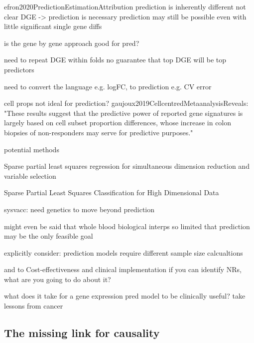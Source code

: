 \begin{outline}
    efron2020PredictionEstimationAttribution prediction is inherently different
            not clear DGE -> prediction is necessary
            prediction may still be possible even with little significant single gene diffs

            is the gene by gene approach good for pred?
        
        need to repeat DGE within folds
            no guarantee that top DGE will be top predictors

        need to convert the language e.g. logFC, to prediction e.g. CV error

        cell props not ideal for prediction?
            gaujoux2019CellcentredMetaanalysisReveals: "These results suggest that the predictive power of reported gene signatures is largely based on cell subset proportion differences, whose increase in colon biopsies of non-responders may serve for predictive purposes."


        potential methods

            Sparse partial least squares regression for simultaneous dimension reduction and variable selection

             Sparse Partial Least Squares Classification for High Dimensional Data 

        sysvacc: need genetics to move beyond prediction

    might even be said that whole blood biological interps so limited that prediction may be the only feasible goal

    explicitly consider:
    prediction models require different sample size calcualtions

    and to Cost-effectiveness and clinical implementation
        if you can identify NRs, what are you going to do about it?

        what does it take for a gene expression pred model to be clinically useful?
            take lessons from cancer

\subsection{The missing link for causality}


\end{outline}
